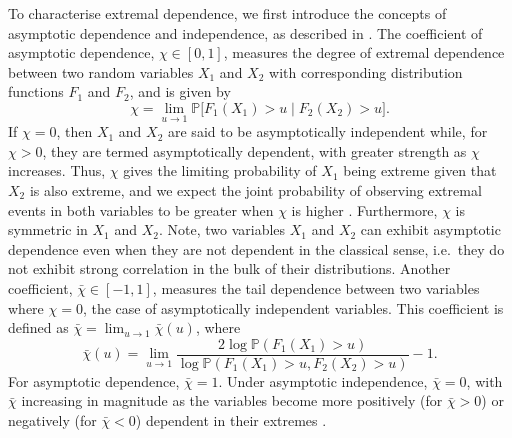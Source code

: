 \documentclass{article}
\numberwithin{equation}{section}
\begin{document}
To characterise extremal dependence, we first introduce the concepts of asymptotic dependence and independence, as described in \citet{Coles1999}.
The coefficient of asymptotic dependence, $\chi \in [0, 1]$, measures the degree of extremal dependence between two random variables $X_1$ and $X_2$ with corresponding distribution functions $F_1$ and $F_2$, and is given by %
\[
  \chi = \lim_{u\to1}\mathbb{P}\bigl[F_1(X_1)>u\mid F_2(X_2)>u\bigr].
\]
If $\chi = 0$, then $X_1$ and $X_2$ are said to be asymptotically independent while, for $\chi > 0$, they are termed asymptotically dependent, with greater strength as $\chi$ increases.
Thus, $\chi$ gives the limiting probability of $X_1$ being extreme given that $X_2$ is also extreme, and we expect the joint probability of observing extremal events in both variables to be greater when $\chi$ is higher \citep{Rohrbeck2021}.
Furthermore, $\chi$ is symmetric in $X_1$ and $X_2$.
Note, two variables $X_1$ and $X_2$ can exhibit asymptotic dependence even when they are not dependent in the classical sense, i.e.\ they do not exhibit strong correlation in the bulk of their distributions.
Another coefficient, $\bar{\chi} \in [-1, 1]$, measures the tail dependence between two variables where $\chi = 0$, the case of asymptotically independent variables.
This coefficient is defined as $\bar{\chi} = \lim_{u \rightarrow 1}{\bar{\chi}(u)}$, where
\[
  \bar{\chi}(u) = \lim_{u \rightarrow 1} \frac{2\log\mathbb{P}(F_1(X_1) > u)}{ \log{\mathbb{P}(F_1(X_1) > u, F_2(X_2) > u)}} - 1.
\]
For asymptotic dependence, $\bar{\chi} = 1$.
Under asymptotic independence, $\bar{\chi} = 0$, with $\bar{\chi}$ increasing in magnitude as the variables become more positively (for $\bar{\chi} > 0$) or negatively (for $\bar{\chi} < 0$) dependent in their extremes \citep{Vignotto2021}.
\end{document}
